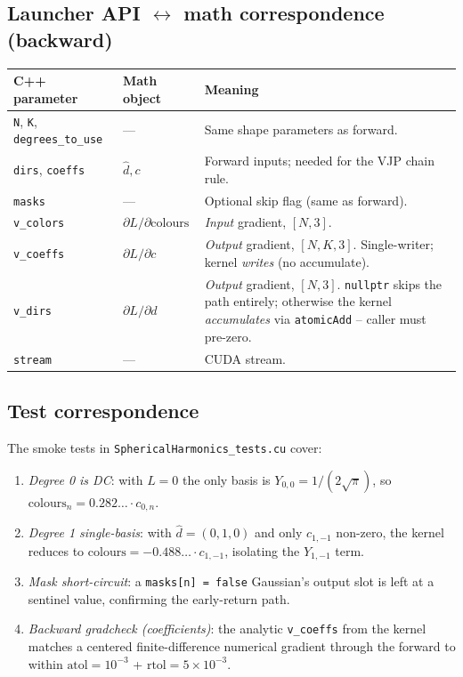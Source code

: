 \documentclass[11pt]{article}
\begin{document}
\subsection{Launcher API \texorpdfstring{$\leftrightarrow$}{<->} math correspondence (backward)}

\begin{center}
\begin{tabular}{l l p{8.0cm}}
\hline
\textbf{C++ parameter} & \textbf{Math object} & \textbf{Meaning} \\
\hline
\texttt{N}, \texttt{K}, \texttt{degrees\_to\_use} & --- &
Same shape parameters as forward. \\
\texttt{dirs}, \texttt{coeffs} & $\hat d, c$ &
Forward inputs; needed for the VJP chain rule. \\
\texttt{masks} & --- & Optional skip flag (same as forward). \\
\texttt{v\_colors} & $\partial L / \partial \text{colours}$ &
\emph{Input} gradient, $[N, 3]$. \\
\texttt{v\_coeffs} & $\partial L / \partial c$ &
\emph{Output} gradient, $[N, K, 3]$. Single-writer; kernel
\emph{writes} (no accumulate). \\
\texttt{v\_dirs} & $\partial L / \partial d$ &
\emph{Output} gradient, $[N, 3]$. \texttt{nullptr} skips the path
entirely; otherwise the kernel \emph{accumulates} via
\texttt{atomicAdd} -- caller must pre-zero. \\
\texttt{stream} & --- & CUDA stream. \\
\hline
\end{tabular}
\end{center}

\subsection{Test correspondence}

The smoke tests in \texttt{SphericalHarmonics\_tests.cu} cover:
\begin{enumerate}
  \item \emph{Degree 0 is DC}: with $L = 0$ the only basis is
  $Y_{0,0} = 1/(2\sqrt{\pi})$, so
  $\text{colours}_n = 0.282\dots \cdot c_{0, n}$.
  \item \emph{Degree 1 single-basis}: with $\hat d = (0, 1, 0)$ and
  only $c_{1,-1}$ non-zero, the kernel reduces to
  $\text{colours} = -0.488\dots \cdot c_{1,-1}$, isolating the
  $Y_{1,-1}$ term.
  \item \emph{Mask short-circuit}: a \texttt{masks[n] = false}
  Gaussian's output slot is left at a sentinel value, confirming the
  early-return path.
  \item \emph{Backward gradcheck (coefficients)}: the analytic
  \texttt{v\_coeffs} from the kernel matches a centered
  finite-difference numerical gradient through the forward to within
  $\text{atol} = 10^{-3}$ + $\text{rtol} = 5 \times 10^{-3}$.
\end{enumerate}
\end{document}
